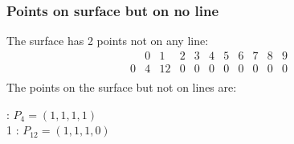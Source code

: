 \documentclass{article}
\begin{document}
{\subsubsection*{Points on surface but on no line}
The surface has 2 points not on any line:\\
$$
\begin{array}{r|*{10}{r}}
 & 0 & 1 & 2 & 3 & 4 & 5 & 6 & 7 & 8 & 9\\
\hline
0 & 4 & 12 & 0 & 0 & 0 & 0 & 0 & 0 & 0 & 0\\
\end{array}
$$
The points on the surface but not on lines are:\\
\begin{multicols}{2}
 : $P_{4}=( 1, 1, 1, 1 )$\\
1 : $P_{12}=( 1, 1, 1, 0 )$\\
\end{multicols}
}
\end{document}
